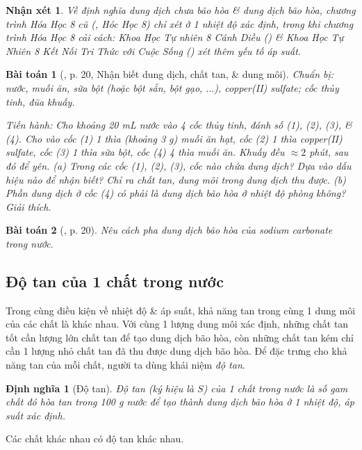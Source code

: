 \documentclass{article}
\newtheorem{baitoan}{Bài toán}
\newtheorem{dinhnghia}{Định nghĩa}
\newtheorem{nhanxet}{Nhận xét}
\begin{document}
\begin{nhanxet}
	Về định nghĩa dung dịch chưa bão hòa \& dung dịch bão hòa, chương trình Hóa Học 8 cũ (\cite{SGK_Hoa_Hoc_8}, Hóc Học 8) chỉ xét ở 1 nhiệt độ xác định, trong khi chương trình Hóa Học 8 cải cách: Khoa Học Tự nhiên 8 Cánh Diều (\cite{SGK_KHTN_8_Canh_Dieu}) \& Khoa Học Tự Nhiên 8 Kết Nối Tri Thức với Cuộc Sống (\cite{SGK_KHTN_8_KNTTVCS}) xét thêm yếu tố áp suất.
\end{nhanxet}

\begin{baitoan}[\cite{SGK_KHTN_8_KNTTVCS}, p. 20, Nhận biết dung dịch, chất tan, \& dung môi]
	\emph{Chuẩn bị:} nước, muối ăn, sữa bột (hoặc bột sắn, bột gạo, $\ldots$), copper(II) sulfate; cốc thủy tinh, đũa khuấy.
	
	\emph{Tiến hành:} Cho khoảng \emph{20 mL} nước vào 4 cốc thủy tinh, đánh số (1), (2), (3), \& (4). Cho vào cốc (1) 1 thìa (khoảng \emph{3 g}) muối ăn hạt, cốc (2) 1 thìa copper(II) sulfate, cốc (3) 1 thìa sữa bột, cốc (4) 4 thìa muối ăn. Khuấy đều $\approx2$ phút, sau đó để yên. (a) Trong các cốc (1), (2), (3), cốc nào chứa dung dịch? Dựa vào dấu hiệu nào để nhận biết? Chỉ ra chất tan, dung môi trong dung dịch thu được. (b) Phần dung dịch ở cốc (4) có phải là dung dịch bão hòa ở nhiệt độ phòng không? Giải thích.
\end{baitoan}

\begin{baitoan}[\cite{SGK_KHTN_8_KNTTVCS}, p. 20]
	Nêu cách pha dung dịch bão hòa của sodium carbonate \emph{} trong nước.
\end{baitoan}

\subsection{Độ tan của 1 chất trong nước}
Trong cùng điều kiện về nhiệt độ \& áp suất, khả năng tan trong cùng 1 dung môi của các chất là khác nhau. Với cùng 1 lượng dung môi xác định, những chất tan tốt cần lượng lớn chất tan để tạo dung dịch bão hòa, còn những chất tan kém chỉ cần 1 lượng nhỏ chất tan đã thu được dung dịch bão hòa. Để đặc trưng cho khả năng tan của mỗi chất, người ta dùng khái niệm \textit{độ tan}.

\begin{dinhnghia}[Độ tan]
	\emph{Độ tan} (ký hiệu là $S$) của 1 chất trong nước là số gam chất đó hòa tan trong \emph{100 g} nước để tạo thành dung dịch bão hòa ở 1 nhiệt độ, áp suất xác định.
\end{dinhnghia}
Các chất khác nhau có độ tan khác nhau.
\end{document}
